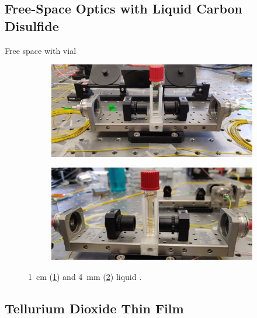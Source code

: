 \subsection{Free-Space Optics with Liquid Carbon Disulfide}
\label{subsec:Raman:Target:CS2Vial}

Free space with vial

\begin{figure}[t]
    \centering
    \begin{subfigure}[b]{0.49\textwidth}
        \centering
        \includegraphics[width=\textwidth]{figs/4-Raman/1cmCS2.jpeg}
        \caption{}
        \label{fig:Raman:1cmCS2}
    \end{subfigure}
    \hfill
    \begin{subfigure}[b]{0.49\textwidth}
        \centering
        \includegraphics[width=\textwidth]{figs/4-Raman/4mmCS2.jpg}
        \caption{}
        \label{fig:Raman:4mmCS2}
    \end{subfigure}
    \caption{\SI{1}{\centi\meter} (\ref{fig:Raman:1cmCS2}) and \SI{4}{\milli\meter} (\ref{fig:Raman:4mmCS2}) liquid .}
    \label{fig:Raman:CS2Cuvet}
\end{figure}

\subsection{Tellurium Dioxide Thin Film}
\label{subsec:Raman:Target:TeO2}

